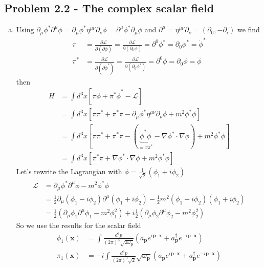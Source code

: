 \documentclass[../main.tex]{subfiles}
\begin{document}
\subsection{Problem 2.2 - The complex scalar field}
\begin{enumerate}[(a)]
\item Using $\partial_\mu\phi^*\partial^\mu\phi=\partial_\mu\phi^*\eta^{\mu\nu}\partial_\nu\phi=\partial^\mu\phi^*\partial_\mu\phi$ and $\partial^\mu=\eta^{\mu\nu}\partial_\nu=(\partial_0,-\partial_i)$ we find 
\begin{align}
\pi
&=\frac{\partial\mathcal{L}}{\partial(\partial\dot\phi)}=\frac{\partial\mathcal{L}}{\partial(\partial_0\phi)}=\partial^0\phi^*=\partial_0\phi^*=\dot\phi^*\\
\pi^*
&=\frac{\partial\mathcal{L}}{\partial(\partial\dot\phi^*)}=\frac{\partial\mathcal{L}}{\partial(\partial_0\phi^*)}=\partial^0\phi=\partial_0\phi=\dot\phi
\end{align}
then
\begin{align}
H&=\int d^3x[\pi\dot\phi+\pi^*\dot\phi^*-\mathcal{L}]\\
&=\int d^3x[\pi\pi^*+\pi^*\pi-\partial_\mu\phi^*\eta^{\mu\nu}\partial_\nu\phi+m^2\phi^*\phi]\\
&=\int d^3x[\pi\pi^*+\pi^*\pi-(\underbrace{\dot\phi^*\dot\phi}_{=\pi\pi^*}-\nabla\phi^*\cdot\nabla\phi)+m^2\phi^*\phi]\\
&=\int d^3x[\pi^*\pi+\nabla\phi^*\cdot\nabla\phi+m^2\phi^*\phi]
\end{align}
Let's rewrite the Lagrangian with $\phi=\frac{1}{\sqrt{2}}(\phi_1+i\phi_2)$
\begin{align}
\mathcal{L}&=\partial_\mu\phi^*\partial^\mu\phi-m^2\phi^*\phi\\
&=\frac{1}{2}\partial_\mu(\phi_1-i\phi_2)\partial^\mu(\phi_1+i\phi_2)-\frac{1}{2}m^2(\phi_1-i\phi_2)(\phi_1+i\phi_2)\\
&=\frac{1}{2}(\partial_\mu\phi_1\partial^\mu\phi_1-m^2\phi_1^2)+i\frac{1}{2}(\partial_\mu\phi_2\partial^\mu\phi_2-m^2\phi_2^2)
\end{align}
So we use the results for the scalar field
\begin{align}
\phi_1(\mathbf{x})&=\int\frac{d^3p}{(2\pi)^3\sqrt{2\omega_\mathbf{p}}}\left(a_\mathbf{p}e^{i\mathbf{p}\cdot\mathbf{x}}+a^\dagger_\mathbf{p}e^{-i\mathbf{p}\cdot\mathbf{x}}\right)\\
\pi_1(\mathbf{x})&=-i\int\frac{d^3p}{(2\pi)^3\sqrt{2}}\sqrt{\omega_\mathbf{p}}\left(a_\mathbf{p}e^{i\mathbf{p}\cdot\mathbf{x}}+a^\dagger_\mathbf{p}e^{-i\mathbf{p}\cdot\mathbf{x}}\right)\\

\end{align}
\end{enumerate}
\end{document}
